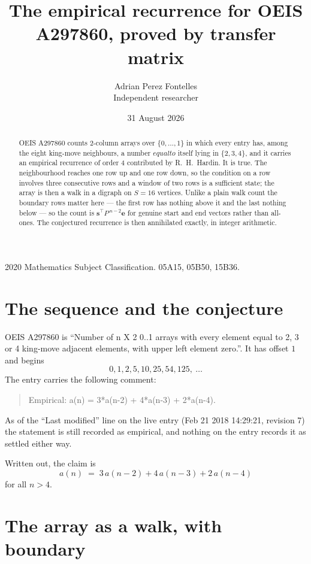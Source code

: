 \documentclass[11pt,a4paper]{article}
\title{The empirical recurrence for OEIS A297860, proved by transfer matrix}
\author{Adrian Perez Fontelles\\ \small Independent researcher}
\date{31 August 2026}
\theoremstyle{plain}
\theoremstyle{definition}
\begin{document}
\maketitle

\begin{abstract}
OEIS A297860 counts $2$-column arrays over $\{0,\dots,1\}$ in which every entry has,
among the eight king-move neighbours, a number $equal to$ itself lying in $\{2,3,4\}$, and it carries an empirical
recurrence of order $4$ contributed by R.~H.~Hardin. It is true. The neighbourhood
reaches one row up and one row down, so the condition on a row involves three consecutive
rows and a window of two rows is a sufficient state; the array is then a walk in a digraph
on $S=16$ vertices. Unlike a plain walk count the boundary rows matter here --- the first
row has nothing above it and the last nothing below --- so the count is
$\mathbf{s}^{\!\top}P^{\,n-2}\mathbf{e}$ for genuine start and end vectors rather than
all-ones. The conjectured recurrence is then annihilated exactly, in integer arithmetic.
\end{abstract}

\noindent\small 2020 Mathematics Subject Classification. 05A15, 05B50, 15B36.\normalsize

\section{The sequence and the conjecture}

OEIS A297860 is ``Number of n X 2 0..1 arrays with every element equal to 2, 3 or 4 king-move adjacent elements, with upper left element zero.''. It has offset
$1$ and begins
\[
0, 1, 2, 5, 10, 25, 54, 125,\ \dots
\]
The entry carries the following comment:
\begin{quote}\small
Empirical: a(n) = 3*a(n-2) + 4*a(n-3) + 2*a(n-4).
\end{quote}
As of the ``Last modified'' line on the live entry (Feb 21 2018 14:29:21, revision
7) the statement is still recorded as empirical, and nothing on the entry
records it as settled either way.

Written out, the claim is
\begin{equation}\label{eq:conj}
a(n)\;=\;3\,a(n-2) + 4\,a(n-3) + 2\,a(n-4)
\end{equation}
for all $n>4$.

\section{The array as a walk, with boundary}
\end{document}
